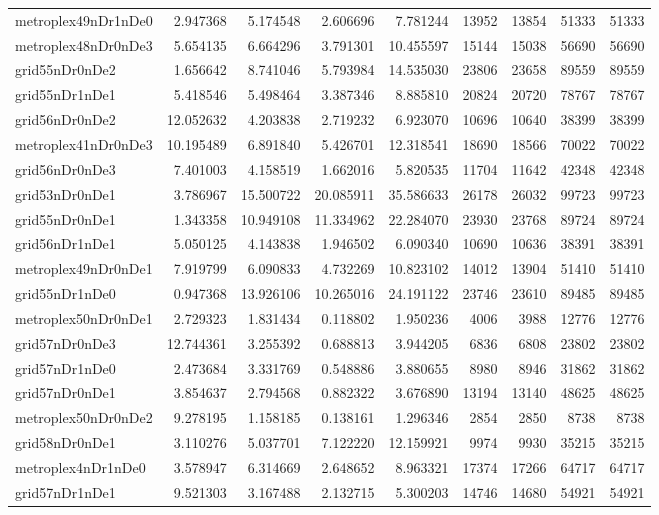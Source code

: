 \begin{longtable}{|l|r|r|r|r|r|r|r|r|}
metroplex49nDr1nDe0 & 2.947368 & 5.174548 & 2.606696 & 7.781244 & 13952 & 13854 & 51333 & 51333 \\
metroplex48nDr0nDe3 & 5.654135 & 6.664296 & 3.791301 & 10.455597 & 15144 & 15038 & 56690 & 56690 \\
grid55nDr0nDe2 & 1.656642 & 8.741046 & 5.793984 & 14.535030 & 23806 & 23658 & 89559 & 89559 \\
grid55nDr1nDe1 & 5.418546 & 5.498464 & 3.387346 & 8.885810 & 20824 & 20720 & 78767 & 78767 \\
grid56nDr0nDe2 & 12.052632 & 4.203838 & 2.719232 & 6.923070 & 10696 & 10640 & 38399 & 38399 \\
metroplex41nDr0nDe3 & 10.195489 & 6.891840 & 5.426701 & 12.318541 & 18690 & 18566 & 70022 & 70022 \\
grid56nDr0nDe3 & 7.401003 & 4.158519 & 1.662016 & 5.820535 & 11704 & 11642 & 42348 & 42348 \\
grid53nDr0nDe1 & 3.786967 & 15.500722 & 20.085911 & 35.586633 & 26178 & 26032 & 99723 & 99723 \\
grid55nDr0nDe1 & 1.343358 & 10.949108 & 11.334962 & 22.284070 & 23930 & 23768 & 89724 & 89724 \\
grid56nDr1nDe1 & 5.050125 & 4.143838 & 1.946502 & 6.090340 & 10690 & 10636 & 38391 & 38391 \\
metroplex49nDr0nDe1 & 7.919799 & 6.090833 & 4.732269 & 10.823102 & 14012 & 13904 & 51410 & 51410 \\
grid55nDr1nDe0 & 0.947368 & 13.926106 & 10.265016 & 24.191122 & 23746 & 23610 & 89485 & 89485 \\
metroplex50nDr0nDe1 & 2.729323 & 1.831434 & 0.118802 & 1.950236 & 4006 & 3988 & 12776 & 12776 \\
grid57nDr0nDe3 & 12.744361 & 3.255392 & 0.688813 & 3.944205 & 6836 & 6808 & 23802 & 23802 \\
grid57nDr1nDe0 & 2.473684 & 3.331769 & 0.548886 & 3.880655 & 8980 & 8946 & 31862 & 31862 \\
grid57nDr0nDe1 & 3.854637 & 2.794568 & 0.882322 & 3.676890 & 13194 & 13140 & 48625 & 48625 \\
metroplex50nDr0nDe2 & 9.278195 & 1.158185 & 0.138161 & 1.296346 & 2854 & 2850 & 8738 & 8738 \\
grid58nDr0nDe1 & 3.110276 & 5.037701 & 7.122220 & 12.159921 & 9974 & 9930 & 35215 & 35215 \\
metroplex4nDr1nDe0 & 3.578947 & 6.314669 & 2.648652 & 8.963321 & 17374 & 17266 & 64717 & 64717 \\
grid57nDr1nDe1 & 9.521303 & 3.167488 & 2.132715 & 5.300203 & 14746 & 14680 & 54921 & 54921 \\

\end{longtable}
